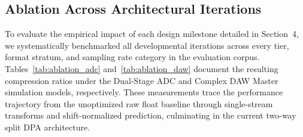 \documentclass[10pt,twocolumn]{article}
\begin{document}
\subsection{Ablation Across Architectural Iterations}
\label{sec:ablation_benchmarks}

To evaluate the empirical impact of each design milestone detailed in Section~4, we systematically benchmarked all developmental iterations across every tier, format stratum, and sampling rate category in the evaluation corpus. Tables~\ref{tab:ablation_adc} and~\ref{tab:ablation_daw} document the resulting compression ratios under the Dual-Stage ADC and Complex DAW Master simulation models, respectively. These measurements trace the performance trajectory from the unoptimized raw float baseline through single-stream transforms and shift-normalized prediction, culminating in the current two-way split DPA architecture.
\end{document}
